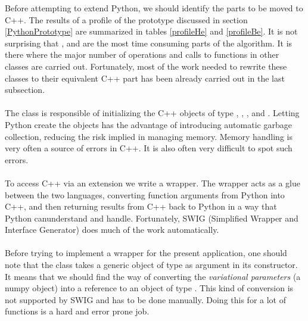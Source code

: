 \noindent
Before attempting to extend Python, we should identify the parts to be moved to C++. The results of a profile of the  prototype discussed in section \ref{PythonPrototype} are summarized in tables \ref{profileHe} and \ref{profileBe}. It is not surprising that ,  and  are the most time consuming parts of the algorithm. It is there where the major number of operations and calls to functions in other classes are carried out. Fortunately, most of the work needed to rewrite these classes to their equivalent C++ part 
has been already carried out in the last subsection.\\
\\
The class  is responsible of initializing the C++ objects of type , , ,  and . Letting Python create the objects has the advantage of introducing automatic garbage collection, reducing the risk implied in managing memory. Memory handling is very often a source of errors in C++. It is also often very difficult to spot such errors.\\
\\
To access C++ via an extension we write a wrapper. The wrapper acts as a glue between the two languages, converting function arguments from Python into C++, and then returning results from C++ back to Python in a way that Python canunderstand and handle. Fortunately, SWIG (Simplified Wrapper and Interface Generator)\cite{Beazley} does much of the work automatically.\\
\\
Before trying to implement a wrapper for the present application, one should note that the  class takes a generic object of type  as argument in its constructor. It means that we should find the way of converting the \emph{variational parameters} (a numpy object) into a reference to an object of type . This kind of conversion is not supported by SWIG and has to be done manually. Doing this for a lot of functions is a hard and error prone job. \\

